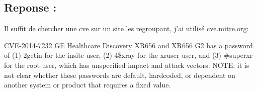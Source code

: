 \documentclass{article}
\begin{document}
    \subsection{Reponse :}
        Il suffit de chercher une cve sur un site les regroupant, j’ai utilisé cve.mitre.org:

        CVE-2014-7232 		GE Healthcare Discovery XR656 and XR656 G2 has a password of
        \newline(1) 2getin for the insite user,
        \newline(2) 4\$xray for the xruser user, and
        \newline(3) \#superxr for the root user, which has unspecified impact and attack vectors. \newline
        NOTE: it is not clear whether these passwords are default, hardcoded, or dependent on another system or product that requires a fixed value.
\end{document}
